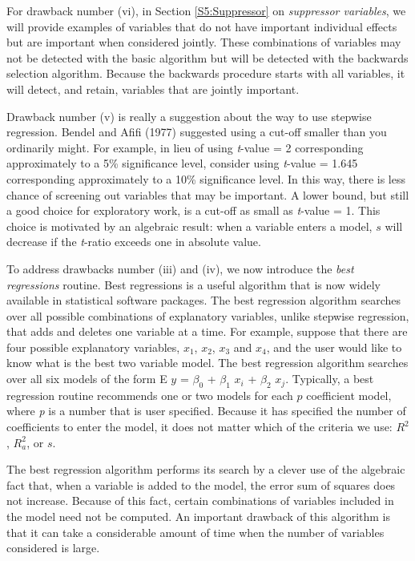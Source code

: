 For drawback number (vi), in Section \ref{S5:Suppressor} on
\textit{suppressor variables}, we will provide examples of variables
that do not have important individual effects but are important when
considered jointly. These combinations of variables may not be
detected with the basic algorithm but will be detected with the
backwards selection algorithm. Because the backwards procedure
starts with all variables, it will detect, and retain, variables
that are jointly important.

Drawback number (v) is really a suggestion about the way to use
stepwise regression. Bendel and Afifi (1977) suggested using a
cut-off smaller than you ordinarily might. For example, in lieu of
using \textit{t}-value = 2 corresponding approximately to a 5\%
significance level, consider using \textit{t}-value = 1.645
corresponding approximately to a 10\% significance level. In this
way, there is less chance of screening out variables that may be
important. A lower bound, but still a good choice for exploratory
work, is a cut-off as small as \textit{t}-value = 1. This choice is
motivated by an algebraic result: when a variable enters a model,
$s$ will decrease if the \textit{t}-ratio exceeds one in absolute
value.


To address drawbacks number (iii) and (iv), we now introduce the \textit{%
best regressions }routine. Best regressions is a useful algorithm that is
now widely available in statistical software packages. The best regression
algorithm searches over all possible combinations of explanatory variables,
unlike stepwise regression, that adds and deletes one variable at a time.
For example, suppose that there are four possible explanatory variables, $%
x_1$, $x_2$, $x_3$ and $x_4$, and the user would like to know what
is the best two variable model. The best regression algorithm
searches over all six models of the form E $y$ = $\beta_0$ +
$\beta_1$ $x_i$ + $\beta_2$ $x_j$. Typically, a best regression
routine recommends one or two models for each $p$ coefficient model,
where \textit{p} is a number that is user specified. Because it has
specified the number of coefficients to enter the model, it does not
matter which of the criteria we use: $R^2$, $R_a^2$, or
$s$.

The best regression algorithm performs its search by a clever use of
the algebraic fact that, when a variable is added to the model, the
error sum of squares does not increase. Because of this fact,
certain combinations of variables included in the model need not be
computed. An important drawback of this algorithm is that it can
take a considerable amount of time when the number of variables
considered is large.

